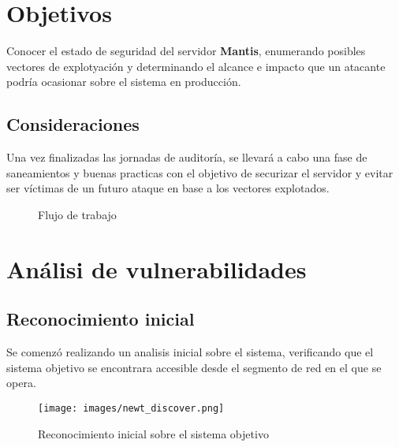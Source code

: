 \documentclass[a4paper]{article} %
\newcommand{\machineName}{Mantis} %
\begin{document}
    \section{Objetivos}
    Conocer el estado de seguridad del servidor \textbf{\machineName}, 
    enumerando posibles vectores de explotyación y determinando el alcance 
    e impacto que un atacante podría ocasionar sobre el sistema en producción.

    \subsection{Consideraciones}
    Una vez finalizadas las jornadas de auditoría, se llevará a cabo
    una fase de saneamientos y buenas practicas con el objetivo de 
    securizar el servidor y evitar ser víctimas de un futuro ataque 
    en base a los vectores explotados.
    
    \begin{figure}[h]
    \begin{center}
    \end{center}    
    \caption{Flujo de trabajo}
    \end{figure}

    \clearpage
    \section{Análisi de vulnerabilidades}
    \subsection{Reconocimiento inicial}
    \vspace{0.2cm}

    Se comenzó realizando un analisis inicial sobre el sistema, 
    verificando que el sistema objetivo se encontrara accesible 
    desde el segmento de red en el que se opera.

    \begin{figure}[h]
    \begin{center}
    \texttt{[image: images/newt\_discover.png]}
    \end{center}
    \caption{Reconocimiento inicial sobre el sistema objetivo}    
    \end{figure}
\end{document}
